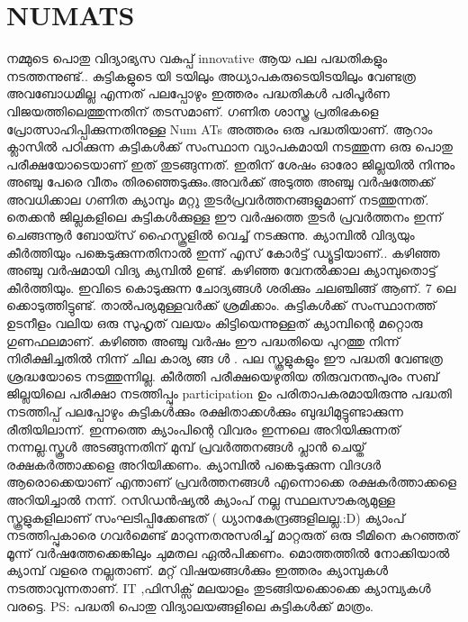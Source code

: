 \documentclass[10pt,a4paper]{report}
\begin{document}
     
\section{NUMATS}
നമ്മുടെ പൊതു വിദ്യാഭ്യസ വകുപ്പ് innovative ആയ പല പദ്ധതികളും നടത്തന്നുണ്ട്.. കുട്ടികളുടെ യി ടയിലും അധ്യാപകരുടെയിടയിലും വേണ്ടത്ര അവബോധമില്ല എന്നത് പലപ്പോഴും ഇത്തരം പദ്ധതികൾ പരിപൂർണ വിജയത്തിലെത്തുന്നതിന് തടസമാണ്. ഗണിത ശാസ്ത്ര പ്രതിഭകളെ പ്രോത്സാഹിപ്പിക്കുന്നതിനുള്ള Num ATs അത്തരം ഒരു പദ്ധതിയാണ്. ആറാം ക്ലാസിൽ പഠിക്കുന്ന കുട്ടികൾക്ക് സംസ്ഥാന വ്യാപകമായി നടത്തുന്ന ഒരു പൊതു പരീക്ഷയോടെയാണ് ഇത് തുടങ്ങുന്നത്. ഇതിന് ശേഷം ഓരോ ജില്ലയിൽ നിന്നും അഞ്ചു പേരെ വീതം തിരഞ്ഞെടുക്കും.അവർക്ക് അടുത്ത അഞ്ചു വർഷത്തേക്ക് അവധിക്കാല ഗണിത ക്യാമ്പും മറ്റു തുടർപ്രവർത്തനങ്ങളുമാണ് നടത്തുന്നത്. തെക്കൻ ജില്ലകളിലെ കുട്ടികൾക്കുള്ള ഈ വർഷത്തെ തുടർ പ്രവർത്തനം ഇന്ന് ചെങ്ങന്നൂർ ബോയ്സ് ഹൈസ്കൂളിൽ വെച്ച് നടക്കുന്നു. ക്യാമ്പിൽ വിദ്യയും കീർത്തിയും പങ്കെടുക്കുന്നതിനാൽ ഇന്ന് എസ് കോർട്ട് ഡ്യൂട്ടിയാണ്.. കഴിഞ്ഞ അഞ്ചു വർഷമായി വിദ്യ ക്യമ്പിൽ ഉണ്ട്. കഴിഞ്ഞ വേനൽക്കാല ക്യാമ്പുതൊട്ട് കീർത്തിയും. ഇവിടെ കൊടുക്കുന്ന ചോദ്യങ്ങൾ ശരിക്കും ചലഞ്ചിങ്ങ് ആണ്. 7 ലെ ക്കൊടുത്തിട്ടുണ്ട്. താൽപര്യമുള്ളവർക്ക് ശ്രമിക്കാം. കുട്ടികൾക്ക് സംസ്ഥാനത്ത് ഉടനീളം വലിയ ഒരു സുഹൃത് വലയം കിട്ടിയെന്നുള്ളത് ക്യാമ്പിന്റെ മറ്റൊരു ഗുണഫലമാണ്. 
 കഴിഞ്ഞ അഞ്ചു വർഷം ഈ പദ്ധതിയെ പുറത്തു നിന്ന് നിരീക്ഷിച്ചതിൽ നിന്ന് ചില കാര്യ ങ്ങ ൾ . പല സ്കൂളുകളും ഈ പദ്ധതി വേണ്ടത്ര ശ്രദ്ധയോടെ നടത്തുന്നില്ല. കീർത്തി പരീക്ഷയെഴുതിയ തിരുവനന്തപുരം സബ് ജില്ലയിലെ പരീക്ഷാ നടത്തിപ്പും participation ഉം പരിതാപകരമായിരുന്നു പദ്ധതി നടത്തിപ്പ് പലപ്പോഴും കുട്ടികൾക്കും രക്ഷിതാക്കൾക്കും ബുദ്ധിമുട്ടുണ്ടാക്കുന്ന രീതിയിലാന്ന്. ഇന്നത്തെ ക്യാംപിന്റെ വിവരം ഇന്നലെ അറിയിക്കുന്നത് നന്നല്ല.സ്കൂൾ അടങ്ങുന്നതിന് മുമ്പ് പ്രവർത്തനങ്ങൾ പ്ലാൻ ചെയ്ത് രക്ഷകർത്താക്കളെ അറിയിക്കണം. ക്യാമ്പിൽ പങ്കെടുക്കുന്ന വിദഗ്ദർ ആരൊക്കെയാണ് എന്താണ് പ്രവർത്തനങ്ങൾ എന്നൊക്കെ രക്ഷകർത്താക്കളെ അറിയിച്ചാൽ നന്ന്. റസിഡൻഷ്യൽ ക്യാംപ് നല്ല സ്ഥലസൗകര്യമുള്ള സ്കൂളുകളിലാണ് സംഘടിപ്പിക്കേണ്ടത് ( ധ്യാനകേന്ദ്രങ്ങളിലല്ല.:D) ക്യാംപ് നടത്തിപ്പുകാരെ ഗവർമെണ്ട് മാറുന്നതനുസരിച്ച് മാറ്റരുത് ഒരു ടീമിനെ കുറഞ്ഞത് മൂന്ന് വർഷത്തേക്കെങ്കിലും ചുമതല ഏൽപിക്കണം. മൊത്തത്തിൽ നോക്കിയാൽ ക്യാമ്പ് വളരെ നല്ലതാണ്. മറ്റ് വിഷയങ്ങൾക്കും ഇത്തരം ക്യാമ്പുകൾ നടത്താവുന്നതാണ്. IT ,ഫിസിക്സ് മലയാളം തുടങ്ങിയക്കൊക്കെ ക്യാമ്പ്യകൾ വരട്ടെ. PS: പദ്ധതി പൊതു വിദ്യാലയങ്ങളിലെ കുട്ടികൾക്ക് മാത്രം.
\end{document}
